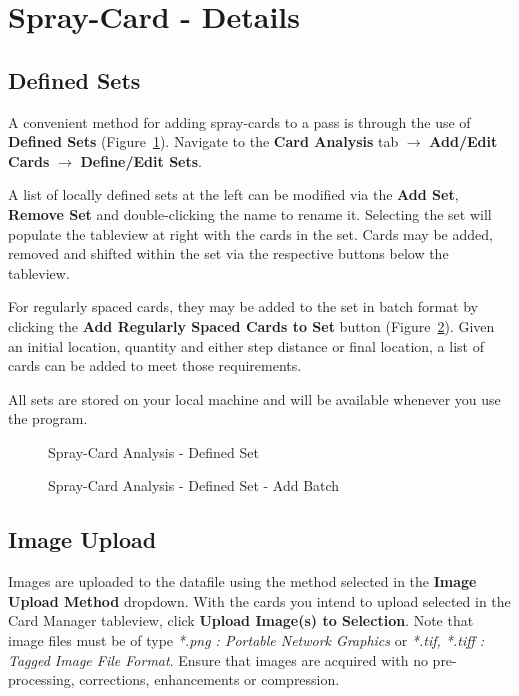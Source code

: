 \documentclass[10pt,letterpaper,titlepage]{article}
\begin{document}
    \newpage

    \section{Spray-Card - Details}

    \subsection{Defined Sets}
    \label{sec:defined_sets}
    A convenient method for adding spray-cards to a pass is through the use of \textbf{Defined Sets} (Figure~\ref{fig:card_defined_set}). Navigate to the \textbf{Card Analysis} tab $\rightarrow$ \textbf{Add/Edit Cards} $\rightarrow$ \textbf{Define/Edit Sets}.\par
    A list of locally defined sets at the left can be modified via the \textbf{Add Set}, \textbf{Remove Set} and double-clicking the name to rename it. Selecting the set will populate the tableview at right with the cards in the set. Cards may be added, removed and shifted within the set via the respective buttons below the tableview.\par
    For regularly spaced cards, they may be added to the set in batch format by clicking the \textbf{Add Regularly Spaced Cards to Set} button (Figure~\ref{fig:card_defined_set_batch}). Given an initial location, quantity and either step distance or final location, a list of cards can be added to meet those requirements.\par
    All sets are stored on your local machine and will be available whenever you use the program.
    \begin{figure}[hb]
        \centering
        \caption{Spray-Card Analysis - Defined Set}
        \label{fig:card_defined_set}
    \end{figure}
    \begin{figure}[hb]
        \centering
        \caption{Spray-Card Analysis - Defined Set - Add Batch}
        \label{fig:card_defined_set_batch}
    \end{figure}
    \FloatBarrier

    \subsection{Image Upload}
    \label{sec:image_upload}
    Images are uploaded to the datafile using the method selected in the \textbf{Image Upload Method} dropdown. With the cards you intend to upload selected in the Card Manager tableview, click \textbf{Upload Image(s) to Selection}. Note that image files must be of type \textit{*.png : Portable Network Graphics} or \textit{*.tif, *.tiff : Tagged Image File Format}. Ensure that images are acquired with no pre-processing, corrections, enhancements or compression.
\end{document}

